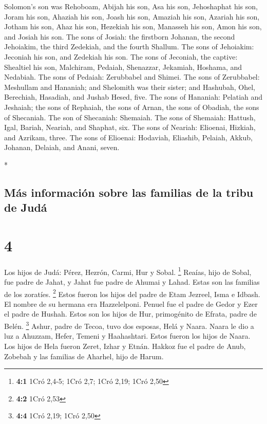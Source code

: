 \begin{paracol}{2}
\begin{otherlanguage}{english}
 Solomon's son was Rehoboam, Abijah his son, Asa his son,
Jehoshaphat his son,  Joram his son, Ahaziah his son,
Joash his son,  Amaziah his son, Azariah his son, Jotham
his son,  Ahaz his son, Hezekiah his son, Manasseh his
son,  Amon his son, and Josiah his son. 
The sons of Josiah: the firstborn Johanan, the second Jehoiakim, the
third Zedekiah, and the fourth Shallum.  The sons of
Jehoiakim: Jeconiah his son, and Zedekiah his son.  The
sons of Jeconiah, the captive: Shealtiel his son, 
Malchiram, Pedaiah, Shenazzar, Jekamiah, Hoshama, and Nedabiah.
 The sons of Pedaiah: Zerubbabel and Shimei. The sons of
Zerubbabel: Meshullam and Hananiah; and Shelomith was their sister;
 and Hashubah, Ohel, Berechiah, Hasadiah, and Jushab
Hesed, five.  The sons of Hananiah: Pelatiah and
Jeshaiah; the sons of Rephaiah, the sons of Arnan, the sons of Obadiah,
the sons of Shecaniah.  The son of Shecaniah: Shemaiah.
The sons of Shemaiah: Hattush, Igal, Bariah, Neariah, and Shaphat, six.
 The sons of Neariah: Elioenai, Hizkiah, and Azrikam,
three.  The sons of Elioenai: Hodaviah, Eliashib,
Pelaiah, Akkub, Johanan, Delaiah, and Anani, seven.

\end{otherlanguage}

\switchcolumn[0]*

\hypertarget{muxe1s-informaciuxf3n-sobre-las-familias-de-la-tribu-de-juduxe1}{%
\subsection{Más información sobre las familias de la tribu de
Judá}\label{muxe1s-informaciuxf3n-sobre-las-familias-de-la-tribu-de-juduxe1}}

\hypertarget{section-6}{%
\section{4}\label{section-6}}

 Los hijos de Judá: Pérez, Hezrón, Carmi, Hur y Sobal.
\footnote{\textbf{4:1} 1Cró 2,4-5; 1Cró 2,7; 1Cró 2,19; 1Cró 2,50}
 Reaías, hijo de Sobal, fue padre de Jahat, y Jahat fue
padre de Ahumai y Lahad. Estas son las familias de los zoratíes.
\footnote{\textbf{4:2} 1Cró 2,53}  Estos fueron los hijos
del padre de Etam Jezreel, Isma e Idbash. El nombre de su hermana era
Hazzelelponi.  Penuel fue el padre de Gedor y Ezer el
padre de Hushah. Estos son los hijos de Hur, primogénito de Efrata,
padre de Belén. \footnote{\textbf{4:4} 1Cró 2,19; 1Cró 2,50}
 Ashur, padre de Tecoa, tuvo dos esposas, Helá y Naara.
 Naara le dio a luz a Ahuzzam, Hefer, Temeni y
Haahashtari. Estos fueron los hijos de Naara.  Los hijos
de Hela fueron Zeret, Izhar y Etnán.  Hakkoz fue el padre
de Anub, Zobebah y las familias de Aharhel, hijo de Harum.


\end{paracol}
